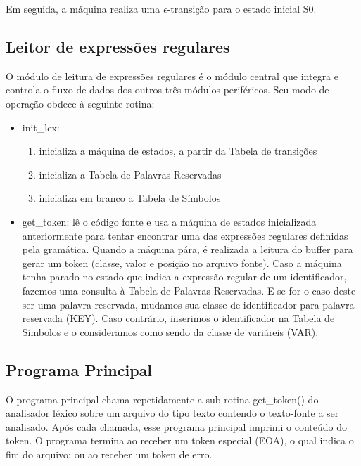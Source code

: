 Em seguida, a máquina realiza uma $\epsilon$-transição para o estado inicial S0.

\subsection{Leitor de expressões regulares}

O módulo de leitura de expressões regulares é o módulo central que integra e controla o fluxo de dados dos outros três módulos periféricos. Seu modo de operação obdece à seguinte rotina:

\begin{itemize}
	\item init\_lex:

	\begin{enumerate}
		\item inicializa a máquina de estados, a partir da Tabela de transições
		\item inicializa a Tabela de Palavras Reservadas
		\item inicializa em branco a Tabela de Símbolos
	\end{enumerate}

	\item get\_token: lê o código fonte e usa a máquina de estados inicializada anteriormente para tentar encontrar uma das expressões regulares definidas pela gramática. Quando a máquina pára, é realizada a leitura do buffer para gerar um token (classe, valor e posição no arquivo fonte). Caso a máquina tenha parado no estado que indica a expressão regular de um identificador, fazemos uma consulta à Tabela de Palavras Reservadas. E se for o caso deste ser uma palavra reservada, mudamos sua classe de identificador para palavra reservada (KEY). Caso contrário, inserimos o identificador na Tabela de Símbolos e o consideramos como sendo da classe de variáreis (VAR).
\end{itemize}

\subsection{Programa Principal}

O programa principal chama repetidamente a sub-rotina get\_token() do analisador léxico sobre um arquivo do tipo texto contendo o texto-fonte a ser analisado. Após cada chamada, esse programa principal imprimi o conteúdo do token. O programa termina ao receber um token especial (EOA), o qual indica o fim do arquivo; ou ao receber um token de erro. 


